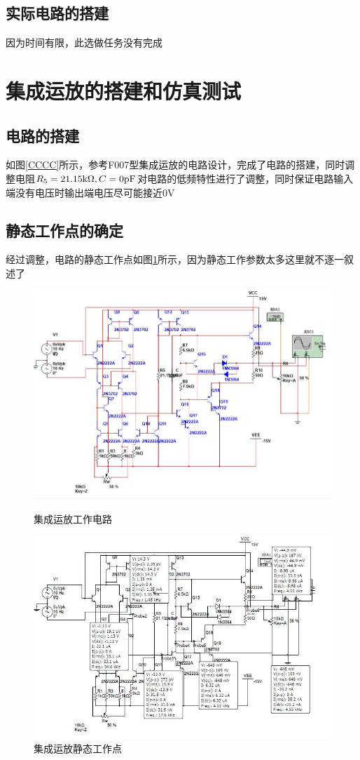 \documentclass[UTF8,a4paper]{ctexart}
\begin{document}
\subsection{实际电路的搭建}
因为时间有限，此选做任务没有完成
\clearpage
\section{集成运放的搭建和仿真测试}
\subsection{电路的搭建}
如图\ref{CCCC}所示，参考F007型集成运放的电路设计，完成了电路的搭建，同时调整电阻$R_5=21.15\mathrm{k}\Omega,C=0\rm{pF}$对电路的低频特性进行了调整，同时保证电路输入端没有电压时输出端电压尽可能接近0V
\subsection{静态工作点的确定}
经过调整，电路的静态工作点如图\ref{static}所示，因为静态工作参数太多这里就不逐一叙述了
\begin{figure}
\centering
\includegraphics[width=\textwidth]{3c.jpg}
\caption{集成运放工作电路}
\label{CCCC}
\includegraphics[width=\textwidth]{3-3static.jpg}
\caption{集成运放静态工作点}
\label{static}
\end{figure}
\end{document}
